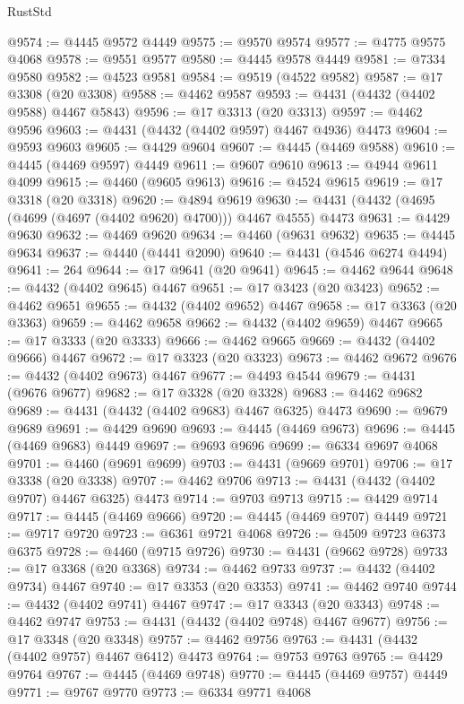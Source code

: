 \begin{lexlean}{RustStd}
\begin{coremodule}
@9574 := @4445 @9572 @4449
@9575 := @9570 @9574
@9577 := @4775 @9575 @4068
@9578 := @9551 @9577
@9580 := @4445 @9578 @4449
@9581 := @7334 @9580
@9582 := @4523 @9581
@9584 := @9519 (@4522 @9582)
@9587 := @17 @3308 (@20 @3308)
@9588 := @4462 @9587
@9593 := @4431 (@4432 (@4402 @9588) @4467 @5843)
@9596 := @17 @3313 (@20 @3313)
@9597 := @4462 @9596
@9603 := @4431 (@4432 (@4402 @9597) @4467 @4936) @4473
@9604 := @9593 @9603
@9605 := @4429 @9604
@9607 := @4445 (@4469 @9588)
@9610 := @4445 (@4469 @9597) @4449
@9611 := @9607 @9610
@9613 := @4944 @9611 @4099
@9615 := @4460 (@9605 @9613)
@9616 := @4524 @9615
@9619 := @17 @3318 (@20 @3318)
@9620 := @4894 @9619
@9630 := @4431 (@4432 (@4695 (@4699 (@4697 (@4402 @9620) @4700))) @4467 @4555) @4473
@9631 := @4429 @9630
@9632 := @4469 @9620
@9634 := @4460 (@9631 @9632)
@9635 := @4445 @9634
@9637 := @4440 (@4441 @2090)
@9640 := @4431 (@4546 @6274 @4494)
@9641 := 264
@9644 := @17 @9641 (@20 @9641)
@9645 := @4462 @9644
@9648 := @4432 (@4402 @9645) @4467
@9651 := @17 @3423 (@20 @3423)
@9652 := @4462 @9651
@9655 := @4432 (@4402 @9652) @4467
@9658 := @17 @3363 (@20 @3363)
@9659 := @4462 @9658
@9662 := @4432 (@4402 @9659) @4467
@9665 := @17 @3333 (@20 @3333)
@9666 := @4462 @9665
@9669 := @4432 (@4402 @9666) @4467
@9672 := @17 @3323 (@20 @3323)
@9673 := @4462 @9672
@9676 := @4432 (@4402 @9673) @4467
@9677 := @4493 @4544
@9679 := @4431 (@9676 @9677)
@9682 := @17 @3328 (@20 @3328)
@9683 := @4462 @9682
@9689 := @4431 (@4432 (@4402 @9683) @4467 @6325) @4473
@9690 := @9679 @9689
@9691 := @4429 @9690
@9693 := @4445 (@4469 @9673)
@9696 := @4445 (@4469 @9683) @4449
@9697 := @9693 @9696
@9699 := @6334 @9697 @4068
@9701 := @4460 (@9691 @9699)
@9703 := @4431 (@9669 @9701)
@9706 := @17 @3338 (@20 @3338)
@9707 := @4462 @9706
@9713 := @4431 (@4432 (@4402 @9707) @4467 @6325) @4473
@9714 := @9703 @9713
@9715 := @4429 @9714
@9717 := @4445 (@4469 @9666)
@9720 := @4445 (@4469 @9707) @4449
@9721 := @9717 @9720
@9723 := @6361 @9721 @4068
@9726 := @4509 @9723 @6373 @6375
@9728 := @4460 (@9715 @9726)
@9730 := @4431 (@9662 @9728)
@9733 := @17 @3368 (@20 @3368)
@9734 := @4462 @9733
@9737 := @4432 (@4402 @9734) @4467
@9740 := @17 @3353 (@20 @3353)
@9741 := @4462 @9740
@9744 := @4432 (@4402 @9741) @4467
@9747 := @17 @3343 (@20 @3343)
@9748 := @4462 @9747
@9753 := @4431 (@4432 (@4402 @9748) @4467 @9677)
@9756 := @17 @3348 (@20 @3348)
@9757 := @4462 @9756
@9763 := @4431 (@4432 (@4402 @9757) @4467 @6412) @4473
@9764 := @9753 @9763
@9765 := @4429 @9764
@9767 := @4445 (@4469 @9748)
@9770 := @4445 (@4469 @9757) @4449
@9771 := @9767 @9770
@9773 := @6334 @9771 @4068

\end{coremodule}
\end{lexlean}
